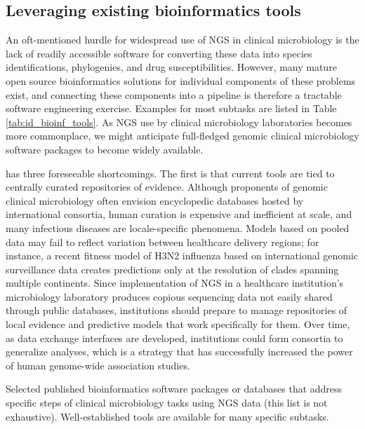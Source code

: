 \subsection{Leveraging existing bioinformatics tools}

An oft-mentioned hurdle\autocite{Didelot2012,Koser2012} for widespread use of NGS in clinical microbiology is the lack of readily accessible software for converting these data into species identifications, phylogenies, and drug susceptibilities. However, many mature open source bioinformatics solutions for individual components of these problems exist, and connecting these components into a pipeline is therefore a tractable software engineering exercise. Examples for most subtasks are listed in Table \ref{tab:id_bioinf_tools}. As NGS use by clinical microbiology laboratories becomes more commonplace, we might anticipate full-fledged genomic clinical microbiology software packages to become widely available.

 has three foreseeable shortcomings. The first is that current tools are tied to centrally curated repositories of evidence. Although proponents of genomic clinical microbiology often envision encyclopedic databases hosted by international consortia,\autocite{Didelot2012,Koser2012} human curation is expensive and inefficient at scale, and many infectious diseases are locale-specific phenomena. Models based on pooled data may fail to reflect variation between healthcare delivery regions;\autocite{Reis2003,Wiens2014} for instance, a recent fitness model of H3N2 influenza based on international genomic surveillance data creates predictions only at the resolution of clades spanning multiple continents.\autocite{Luksza2014} Since implementation of NGS in a healthcare institution’s microbiology laboratory produces copious sequencing data not easily shared through public databases, institutions should prepare to manage repositories of local evidence and predictive models that work specifically for them. Over time, as data exchange interfaces are developed, institutions could form consortia to generalize analyses, which is a strategy that has successfully increased the power of human genome-wide association studies.

\begin{table}[ht]
  
  \caption[Bioinformatics tools for infectious diseases]{Selected published bioinformatics software packages or databases that address specific steps of clinical microbiology tasks using NGS data (this list is not exhaustive). Well-established tools are available for many specific subtasks.}
  \label{tab:id_bioinf_tools}
\end{table}

